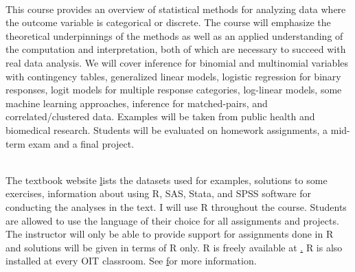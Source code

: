 \documentclass[10pt]{article}
\begin{document}


\bigskip
{}\\
This course provides an overview of statistical methods for analyzing data where the outcome variable is categorical or discrete. The course will emphasize the theoretical underpinnings of the methods as well as an applied understanding of the computation and interpretation, both of which are necessary to succeed with real data analysis. We will cover inference for binomial and multinomial variables with contingency tables, generalized linear models, logistic regression for binary responses, logit models for multiple response categories, log-linear models, some machine  learning approaches, inference for matched-pairs, and correlated/clustered data. Examples will be taken from public health and biomedical research. Students will be evaluated on homework assignments, a mid-term exam and a final project.
 


\bigskip
{}\\
The textbook website \href{http://www.stat.ufl.edu/~aa/cda/cda.html} lists the datasets used for examples, solutions to some exercises, information about using R, SAS, Stata, and SPSS software for conducting the analyses in the text. I will use R throughout the course. Students are allowed to use the language of their choice for all assignments and projects. The instructor will only be able to provide support for assignments done in R and solutions will be given in terms of R only. R is freely available at \href{http://cran.r-project.org/}. R is also installed at every OIT classroom. See \href{http://www.umass.edu/statdata/} for more information. 
 
\end{document}
